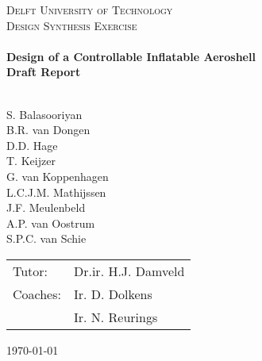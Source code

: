\begin{titlepage}
\begin{center}
\AddToShipoutPicture*{\BackgroundPic}
\color{white}
\textsc{\LARGE Delft University of Technology}\\[0.3cm]
\textsc{\Large Design Synthesis Exercise}\\[0.5cm]

\vspace{5cm}
\HRule \\[0.4cm]
{\Large \bfseries Design of a Controllable Inflatable Aeroshell}\\[0.2cm]
{\Huge \bfseries Draft Report}\\[0.2cm]
\HRule \\[0.5cm]


\begin{flushleft}
\vspace{7cm}

S. Balasooriyan \\ B.R. van Dongen \\ D.D. Hage \\ T. Keijzer \\  G. van Koppenhagen \\ L.C.J.M. Mathijssen \\ J.F. Meulenbeld   \\ A.P. van Oostrum \\ S.P.C. van Schie\\
	\enlargethispage{15mm} \vspace{15mm}
	\hspace{-3.5mm}
	\begin{tabular}{l l}
		Tutor: & Dr.ir. H.J. Damveld \\
		Coaches: & Ir. D. Dolkens \\ 
		& Ir. N. Reurings \\
	\end{tabular}
\vfill
\begin{large}\today \end{large}
\end{flushleft}
\end{center}
\end{titlepage}